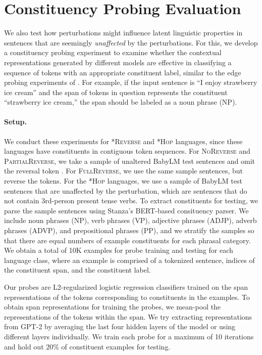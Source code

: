 \documentclass[11pt]{article}
\newcommand{\revmarker}{%
  \setlength{\fboxsep}{1pt}%
  \fbox{\texttt{R}}%
}
\begin{document}
\section{Constituency Probing Evaluation} \label{sec:appendix-probing}
We also test how perturbations might influence latent linguistic properties in sentences that are seemingly \emph{unaffected} by the perturbations. For this, we develop a constituency probing experiment to examine whether the contextual representations generated by different models are effective in classifying a sequence of tokens with an appropriate constituent label, similar to the edge probing experiments of \citealt{tenney2019probing}. For example, if the input sentence is ``I enjoy strawberry ice cream'' and the span of tokens in question represents the constituent ``strawberry ice cream,'' the span should be labeled as a noun phrase (NP).

\paragraph{Setup.}
We conduct these experiments for \textsc{*Reverse} and \textsc{*Hop} languages, since these languages have constituents in contiguous token sequences. For \textsc{NoReverse} and \textsc{PartialReverse}, we take a sample of unaltered BabyLM test sentences and omit the reversal token \revmarker. For  \textsc{FullReverse}, we use the same sample sentences, but reverse the tokens. For the \textsc{*Hop} languages, we use a sample of BabyLM test sentences that are unaffected by the perturbation, which are sentences that do not contain 3rd-person present tense verbs. To extract constituents for testing, we parse the sample sentences using Stanza's BERT-based consituency parser. We include noun phrases (NP), verb phrases (VP), adjective phrases (ADJP), adverb phrases (ADVP), and prepositional phrases (PP), and we stratify the samples so that there are equal numbers of example constituents for each phrasal category. We obtain a total of 10K examples for probe training and testing for each language class, where an example is comprised of a tokenized sentence, indices of the constituent span, and the constituent label.

Our probes are L2-regularized logistic regression classifiers trained on the span representations of the tokens corresponding to constituents in the examples. To obtain span representations for training the probes, we mean-pool the representations of the tokens within the span. We try extracting representations from GPT-2 by averaging the last four hidden layers of the model or using different layers individually. We train each probe for a maximum of 10 iterations and hold out 20\% of constituent examples for testing.
\end{document}
